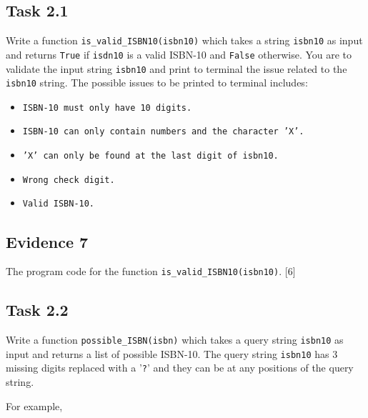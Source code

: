 \subsection*{Task 2.1}

Write a function \texttt{is\_valid\_ISBN10(isbn10)} which takes a
string \texttt{isbn10} as input and returns \texttt{True} if \texttt{isdn10}
is a valid ISBN-10 and \texttt{False} otherwise. You are to validate
the input string \texttt{isbn10} and print to terminal the issue related
to the \texttt{isbn10} string. The possible issues to be printed to
terminal includes:
\begin{itemize}
\item \texttt{ISBN-10 must only have 10 digits. }
\item \texttt{ISBN-10 can only contain numbers and the character 'X'. }
\item \texttt{'X' can only be found at the last digit of isbn10. }
\item \texttt{Wrong check digit.}
\item \texttt{Valid ISBN-10. }
\end{itemize}

\subsection*{Evidence 7 }

The program code for the function \texttt{is\_valid\_ISBN10(isbn10)}.
\hfill{}{[}6{]}

\subsection*{Task 2.2 }

Write a function \texttt{possible\_ISBN(isbn)} which takes a query
string \texttt{isbn10} as input and returns a list of possible ISBN-10.
The query string \texttt{isbn10} has 3 missing digits replaced with
a '\texttt{?}' and they can be at any positions of the query string. 

For example, 

